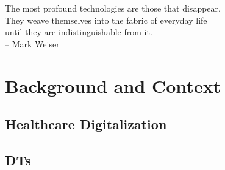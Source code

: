 \documentclass[12pt,a4paper,openright,twoside]{book}
\begin{document}
\glsresetall

\begin{dedication} %
The most profound technologies are those that disappear.
\\
They weave themselves into the fabric of everyday life
\\
until they are indistinguishable from it.
\\
\vspace{1em}
-- Mark Weiser
\end{dedication}


\begin{acknowledgements} %

\end{acknowledgements}

\tableofcontents   
\listoffigures     %
\lstlistoflistings %

\mainmatter

\label{chap:introduction}


\glsresetall

\part{Background and Context}
\label{part:background}

\chapter{Healthcare Digitalization}
\label{chap:back:health4.0}



\chapter{\aclp{DT}}
\label{chap:back:DT}
\end{document}
